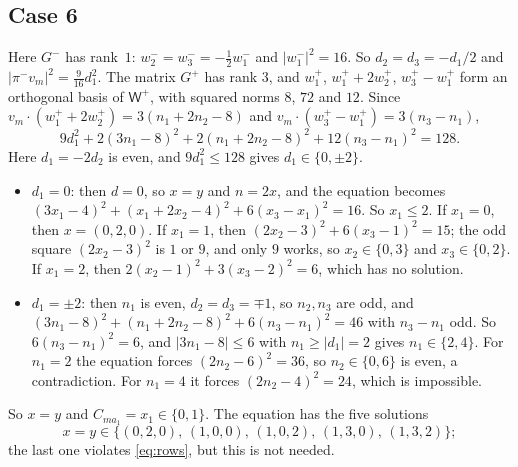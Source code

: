\documentclass[11pt,a4paper]{amsart}
\theoremstyle{definition}
\theoremstyle{remark}
\newcommand{\Wp}{\mathsf{W}^{+}}
\begin{document}
\subsection*{Case 6}
Here $G^-$ has rank~$1$: $w_2^-=w_3^-=-\frac12w_1^-$ and $|w_1^-|^2=16$. So $d_2=d_3=-d_1/2$ and
$|\pi^-v_m|^2=\frac9{16}d_1^2$. The matrix $G^+$ has rank $3$, and $w_1^+$, $w_1^++2w_2^+$, $w_3^+-w_1^+$ form an
orthogonal basis of $\Wp$, with squared norms $8$, $72$ and $12$. Since $v_m\cdot(w_1^++2w_2^+)=3(n_1+2n_2-8)$ and
$v_m\cdot(w_3^+-w_1^+)=3(n_3-n_1)$,
\[
9d_1^2+2(3n_1-8)^2+2(n_1+2n_2-8)^2+12(n_3-n_1)^2=128 .
\]
Here $d_1=-2d_2$ is even, and $9d_1^2\le128$ gives $d_1\in\{0,\pm2\}$.
\begin{itemize}[leftmargin=2em]
\item $d_1=0$: then $d=0$, so $x=y$ and $n=2x$, and the equation becomes
$(3x_1-4)^2+(x_1+2x_2-4)^2+6(x_3-x_1)^2=16$. So $x_1\le2$. If $x_1=0$, then $x=(0,2,0)$. If $x_1=1$, then
$(2x_2-3)^2+6(x_3-1)^2=15$; the odd square $(2x_2-3)^2$ is $1$ or $9$, and only $9$ works, so $x_2\in\{0,3\}$ and
$x_3\in\{0,2\}$. If $x_1=2$, then $2(x_2-1)^2+3(x_3-2)^2=6$, which has no solution.
\item $d_1=\pm2$: then $n_1$ is even, $d_2=d_3=\mp1$, so $n_2,n_3$ are odd, and
$(3n_1-8)^2+(n_1+2n_2-8)^2+6(n_3-n_1)^2=46$ with $n_3-n_1$ odd. So $6(n_3-n_1)^2=6$, and $|3n_1-8|\le6$ with
$n_1\ge|d_1|=2$ gives $n_1\in\{2,4\}$. For $n_1=2$ the equation forces $(2n_2-6)^2=36$, so $n_2\in\{0,6\}$ is even,
a contradiction. For $n_1=4$ it forces $(2n_2-4)^2=24$, which is impossible.
\end{itemize}
So $x=y$ and $C_{ma_1}=x_1\in\{0,1\}$. The equation has the five solutions
\[
x=y\in\{(0,2,0),\,(1,0,0),\,(1,0,2),\,(1,3,0),\,(1,3,2)\};
\]
the last one violates \eqref{eq:rows}, but this is not needed.
\end{document}

